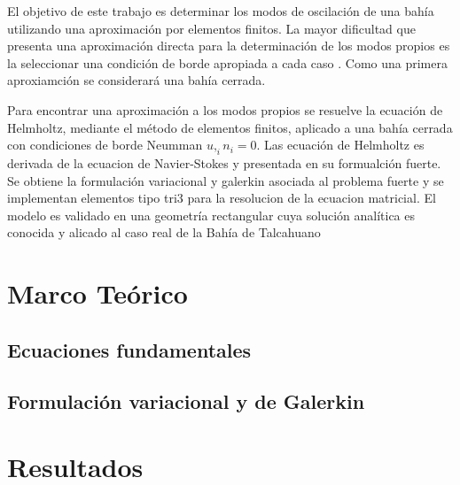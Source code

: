 \documentclass[12pt, letterpaper]{article}
\begin{document}
El objetivo de este trabajo es determinar los modos de oscilaci\'on de una bah\'ia utilizando una aproximaci\'on por elementos finitos. La mayor dificultad que presenta una aproximaci\'on directa para la determinaci\'on de los modos propios es la seleccionar una condici\'on de borde apropiada a cada caso \cite{Mei2005, Rabino2009}. Como una primera aproxiamci\'on se considerar\'a una bah\'ia cerrada.

Para encontrar una aproximaci\'on a los modos propios se resuelve la ecuaci\'on de Helmholtz, mediante el m\'etodo de elementos finitos, aplicado a una bah\'ia cerrada con condiciones de borde Neumman $u,_i  n_i = 0$. Las ecuaci\'on de Helmholtz es derivada de la ecuacion de Navier-Stokes y presentada en su formualci\'on fuerte. Se obtiene la formulaci\'on variacional y galerkin asociada al problema fuerte y se implementan elementos tipo tri3 para la resolucion de la ecuacion matricial. El modelo es validado en una geometr\'ia rectangular cuya soluci\'on anal\'itica es conocida y alicado al caso real de la Bah\'ia de Talcahuano


\section{Marco Te\'orico}
  \subsection{Ecuaciones fundamentales}
  
  \subsection{Formulaci\'on variacional y de Galerkin}
  
\section{Resultados}
  
  
  
\end{document}
